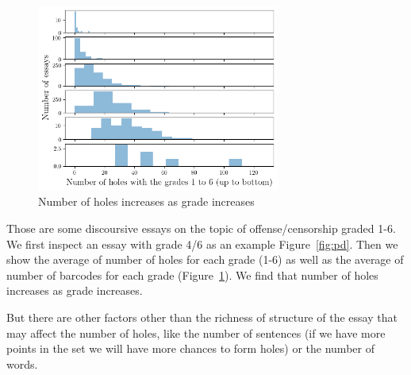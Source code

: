 \begin{figure}[H]
\includegraphics[width=8cm]{gradesh1.png}
\caption{Number of holes increases as grade increases}
\label{fig:ds}
\end{figure}

Those are some discoursive essays on the topic of offense/censorship graded 1-6. We first inspect
an essay with grade 4/6 as an example Figure~\ref{fig:pd}. Then we show
the average of number of holes for each grade (1-6)
as well as the average of number of barcodes for each grade (Figure~\ref{fig:ds}).
We find that number of holes increases as grade increases.

But there are other factors other than the richness of structure of the essay that may affect
the number of holes, like the number of sentences (if we have more points in the set
we will have more chances to form holes) or the number of words.

